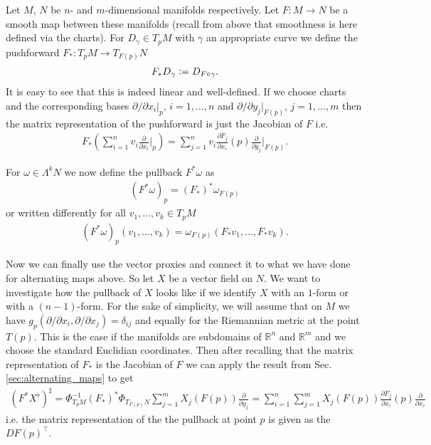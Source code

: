 \documentclass[12pt,a4paper]{article}
\numberwithin{equation}{subsection}
\numberwithin{lemma}{subsection}
\theoremstyle{definition}
\newcommand{\real}{\mathbb{R}}
\begin{document}
Let $M$, $N$ be $n$- and $m$-dimensional manifolds respectively. 
Let $F: M \rightarrow N$ be a smooth map between these manifolds (recall from 
above that smoothness is here defined via the charts). 
For $D_\gamma \in T_p M$ with $\gamma$ an appropriate curve we define the
pushforward $F_*: T_p M \rightarrow T_{F(p)} N$
\begin{align*}
    F_* D_\gamma \vcentcolon= D_{F\circ \gamma}.
\end{align*}
It is easy to see that this is indeed linear and well-defined. If 
we choose charts and the corresponding bases $\partial/\partial x_i |_p$, 
$i=1,...,
n$ and $\partial/\partial y_j |_{F(p)}$, $j=1,...,
m$ then the matrix representation of the pushforward is just the Jacobian
of $F$ i.e. 
\begin{align*}
    F_* \left(\sum_{i=1}^n v_i \frac{\partial}{\partial x_i}\big |_p\right)
    = \sum_{j=1}^n v_i \frac{\partial F_j}{\partial x_i}(p) 
    \frac{\partial}{\partial y_j}\big |_{F(p)}.
\end{align*}

For $\omega \in \Lambda^k N$ we now define the pullback $F^*\omega$ as
\begin{align*}
    (F^*\omega)_p = (F_*)^* \omega_{F(p)}
\end{align*}
or written differently for all $v_1,...,v_k \in T_p M$
\begin{align*}
    (F^*\omega)_p (v_1,...,v_k) = \omega_{F(p)}(F_* v_1, ..., F_* v_k).
\end{align*}

Now we can finally use the vector proxies and connect it to what we have done 
for alternating maps above. So let $X$ be a vector field on $N$. We want to 
investigate how the pullback of $X$ looks like if we identify $X$ with 
an $1$-form or with a $(n-1)$-form. For the sake of simplicity, we will
assume that on $M$ we have $g_p (\partial /\partial x_i, \partial /\partial x_j)
= \delta_{ij}$ and equally for the Riemannian metric at the point $T(p)$. 
This is the case if the manifolds are subdomains of $\real^n$ and $\real^m$ 
and we choose the standard Euclidian coordinates. Then after recalling 
that the matrix representation of $F_*$ is the Jacobian of $F$ we can 
apply the result from Sec.\,\ref{sec:alternating_maps} to get 
\begin{align*}
    (F^* X^\flat)^\sharp 
    = \Phi_{T_p M}^{-1} (F_*)^* \Phi_{T_{F(p)} N} 
    \sum_{j=1}^{m}X_j(F(p)) \frac{\partial}{\partial y_j}
    = \sum_{i=1}^n \sum_{j=1}^m X_j(F(p)) \frac{\partial F_j}{\partial x_i}(p)
        \frac{\partial }{\partial x_i}
\end{align*}
i.e. the matrix representation of the the pullback at point $p$
is given as the $DF(p)^\top$.
\end{document}
